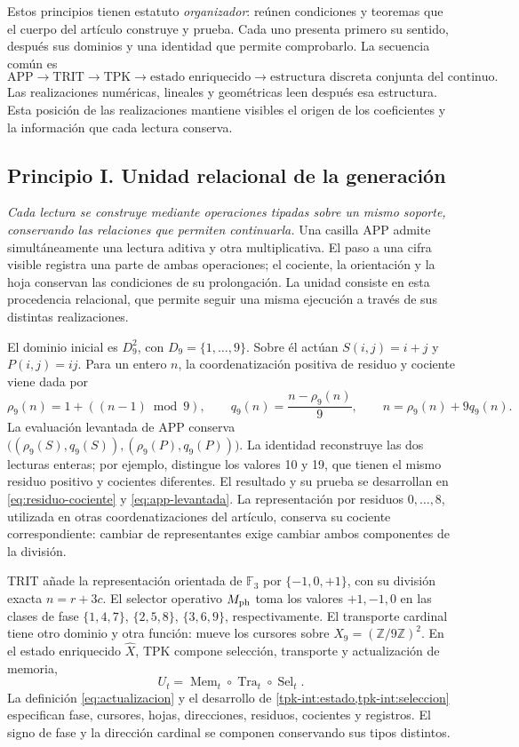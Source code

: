 Estos principios tienen estatuto \emph{organizador}: reúnen condiciones y
teoremas que el cuerpo del artículo construye y prueba. Cada uno presenta primero
su sentido, después sus dominios y una identidad que permite comprobarlo.
La secuencia común es
\[
 \mathrm{APP}\longrightarrow\mathrm{TRIT}\longrightarrow\mathrm{TPK}
 \longrightarrow\text{estado enriquecido}
 \longrightarrow\text{estructura discreta conjunta del continuo}.
\]
Las realizaciones numéricas, lineales y geométricas leen después esa
estructura. Esta posición de las realizaciones mantiene visibles el origen
de los coeficientes y la información que cada lectura conserva.

\subsection*{Principio I. Unidad relacional de la generación}
\hypertarget{prinh:unidad}{}

\emph{Cada lectura se construye mediante operaciones tipadas sobre un
mismo soporte, conservando las relaciones que permiten continuarla.} Una
casilla APP admite simultáneamente una lectura aditiva y otra multiplicativa.
El paso a una cifra visible registra una parte de ambas operaciones; el
cociente, la orientación y la hoja conservan las condiciones de su
prolongación. La unidad consiste en esta procedencia relacional, que permite
seguir una misma ejecución a través de sus distintas realizaciones.

El dominio inicial es \(D_9^2\), con \(D_9=\{1,\ldots,9\}\). Sobre él
actúan \(S(i,j)=i+j\) y \(P(i,j)=ij\). Para un entero \(n\), la coordenatización
positiva de residuo y cociente viene dada por
\[
 \rho_9(n)=1+((n-1)\bmod9),\qquad
 q_9(n)=\frac{n-\rho_9(n)}9,\qquad
 n=\rho_9(n)+9q_9(n).
\]
La evaluación levantada de APP conserva
\(\bigl((\rho_9(S),q_9(S)),(\rho_9(P),q_9(P))\bigr)\).
La identidad reconstruye las dos lecturas enteras; por ejemplo, distingue
los valores 10 y 19, que tienen el mismo residuo positivo y cocientes
diferentes. El resultado y su prueba se desarrollan en
\eqref{eq:residuo-cociente} y \eqref{eq:app-levantada}. La representación
por residuos \(0,\ldots,8\), utilizada en otras coordenatizaciones del artículo, conserva
su cociente correspondiente: cambiar de representantes exige cambiar ambos
componentes de la división.

TRIT añade la representación orientada de \(\mathbb F_3\) por
\(\{-1,0,+1\}\), con su división exacta \(n=r+3c\). El selector operativo
\(M_{\rm ph}\) toma los valores \(+1,-1,0\) en las clases de fase
\(\{1,4,7\}\), \(\{2,5,8\}\), \(\{3,6,9\}\), respectivamente.
El transporte cardinal tiene otro dominio y otra función: mueve los
cursores sobre \(X_9=(\mathbb Z/9\mathbb Z)^2\). En el estado enriquecido
\(\widehat X\), TPK compone selección, transporte y actualización de
memoria,
\[
 U_t=\operatorname{Mem}_t\circ\operatorname{Tra}_t
                    \circ\operatorname{Sel}_t.
\]
La definición \eqref{eq:actualizacion} y el desarrollo de
\cref{tpk-int:estado,tpk-int:seleccion} especifican fase, cursores, hojas,
direcciones, residuos, cocientes y registros. El signo de fase y la dirección
cardinal se componen conservando sus tipos distintos.

